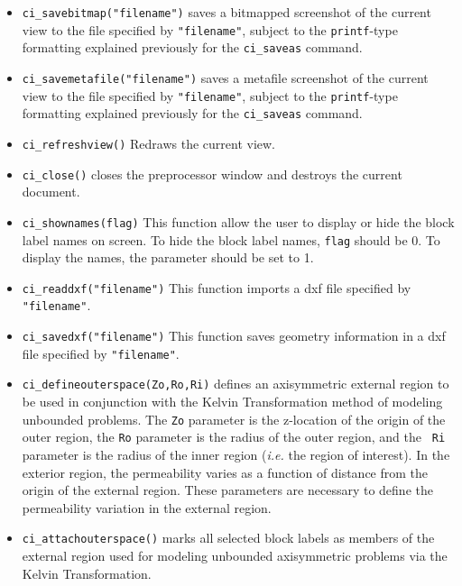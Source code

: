 \begin{itemize}
\item \texttt{ci\_savebitmap("filename")} saves a bitmapped screenshot of the current
view to the file specified by \texttt{"filename"}, subject to the
\texttt{printf}-type formatting explained previously for the
\texttt{ci\_saveas} command.

\item \texttt{ci\_savemetafile("filename")} saves a metafile screenshot of the current
view to the file specified by \texttt{"filename"}, subject to the
\texttt{printf}-type formatting explained previously for the
\texttt{ci\_saveas} command.

\item \texttt{ci\_refreshview()} Redraws the current view.

\item \texttt{ci\_close()} closes the preprocessor window and
destroys the current document.

\item \texttt{ci\_shownames(flag)} This function allow the user to display or hide the
block label names on screen. To hide the block label names,
\texttt{flag} should be 0. To display the names, the parameter
should be set to 1.

\item{\tt ci\_readdxf("filename")} This function imports a dxf file specified by {\tt "filename"}.

\item{\tt ci\_savedxf("filename")} This function saves geometry information in a dxf file specified by {\tt "filename"}.

\item{\tt ci\_defineouterspace(Zo,Ro,Ri)} defines
an axisymmetric external region to be used in conjunction with the
Kelvin Transformation method of modeling unbounded problems.  The
{\tt Zo} parameter is the z-location of the origin of the outer region,
the {\tt Ro} parameter is the radius of the outer region, and the {\tt
Ri} parameter is the radius of the inner region ({\em i.e.} the region of
interest). In the exterior region, the permeability varies as a function of
distance from the origin of the external region.  These parameters
are necessary to define the permeability variation in the external
region.

\item{\tt ci\_attachouterspace()} marks all
selected block labels as members of the external region used for
modeling unbounded axisymmetric problems via the Kelvin
Transformation.


\end{itemize}
